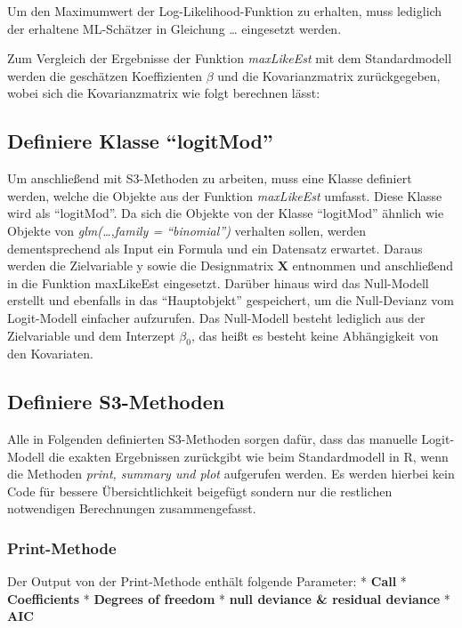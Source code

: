 \documentclass[12pt,]{article}
\begin{document}
Um den Maximumwert der Log-Likelihood-Funktion zu erhalten, muss
lediglich der erhaltene ML-Schätzer in Gleichung \ldots{} eingesetzt
werden.

Zum Vergleich der Ergebnisse der Funktion \emph{maxLikeEst} mit dem
Standardmodell werden die geschätzen Koeffizienten \(\beta\) und die
Kovarianzmatrix zurückgegeben, wobei sich die Kovarianzmatrix wie folgt
berechnen lässt:

\subsection{\texorpdfstring{Definiere Klasse
``logitMod''}{Definiere Klasse logitMod}}\label{definiere-klasse-logitmod}

Um anschließend mit S3-Methoden zu arbeiten, muss eine Klasse definiert
werden, welche die Objekte aus der Funktion \emph{maxLikeEst} umfasst.
Diese Klasse wird als ``logitMod''. Da sich die Objekte von der Klasse
``logitMod'' ähnlich wie Objekte von \emph{glm(\ldots{},family =
``binomial'')} verhalten sollen, werden dementsprechend als Input ein
Formula und ein Datensatz erwartet. Daraus werden die Zielvariable y
sowie die Designmatrix \(\mathbf{X}\) entnommen und anschließend in die
Funktion maxLikeEst eingesetzt. Darüber hinaus wird das Null-Modell
erstellt und ebenfalls in das ``Hauptobjekt'' gespeichert, um die
Null-Devianz vom Logit-Modell einfacher aufzurufen. Das Null-Modell
besteht lediglich aus der Zielvariable und dem Interzept \(\beta_0\),
das heißt es besteht keine Abhängigkeit von den Kovariaten.

\subsection{Definiere S3-Methoden}\label{definiere-s3-methoden}

Alle in Folgenden definierten S3-Methoden sorgen dafür, dass das
manuelle Logit-Modell die exakten Ergebnissen zurückgibt wie beim
Standardmodell in R, wenn die Methoden \emph{print, summary und plot}
aufgerufen werden. Es werden hierbei kein Code für bessere
Übersichtlichkeit beigefügt sondern nur die restlichen notwendigen
Berechnungen zusammengefasst.

\subsubsection{Print-Methode}\label{print-methode}

Der Output von der Print-Methode enthält folgende Parameter: *
\textbf{Call} * \textbf{Coefficients} * \textbf{Degrees of freedom} *
\textbf{null deviance \& residual deviance} * \textbf{AIC}
\end{document}

